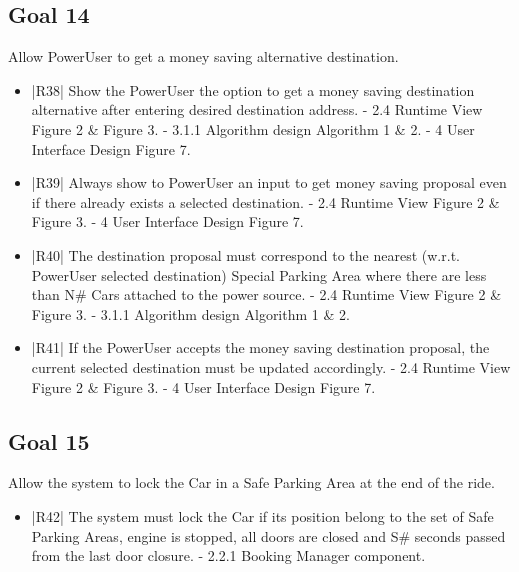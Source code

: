\subsection {Goal 14} Allow PowerUser to get a money saving alternative destination.
\begin{itemize}
 \item |R38| Show the PowerUser the option to get a money saving destination alternative after entering desired destination address.
    \newline - 2.4 Runtime View Figure 2 \& Figure 3.
    \newline - 3.1.1 Algorithm design Algorithm 1 \& 2.   
    \newline - 4 User Interface Design Figure 7.
 \item |R39| Always show to PowerUser an input to get money saving proposal even if there already exists a selected destination.
    \newline - 2.4 Runtime View Figure 2 \& Figure 3.
    \newline - 4 User Interface Design Figure 7.
 \item |R40| The destination proposal must correspond to the nearest (w.r.t. PowerUser selected destination) Special Parking Area where there are less than N\# Cars attached to the power source.
    \newline - 2.4 Runtime View Figure 2 \& Figure 3.
    \newline - 3.1.1 Algorithm design Algorithm 1 \& 2. 
 \item |R41| If the PowerUser accepts the money saving destination proposal, the current selected destination must be updated accordingly.
    \newline - 2.4 Runtime View Figure 2 \& Figure 3.
    \newline - 4 User Interface Design Figure 7.
\end{itemize}

\subsection {Goal 15} Allow the system to lock the Car in a Safe Parking Area at the end of the ride.
\begin{itemize}
 \item |R42| The system must lock the Car if its position belong to the set of Safe Parking
Areas, engine is stopped, all doors are closed and S\# seconds passed from the
last door closure.
    \newline - 2.2.1 Booking Manager component.
\end{itemize}

